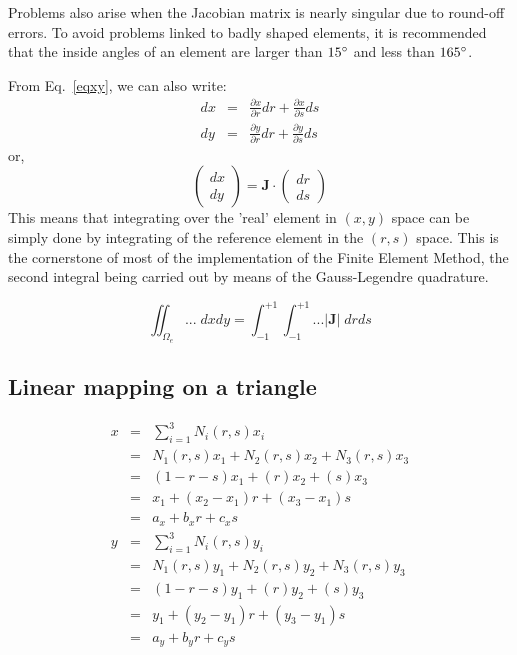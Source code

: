 \begin{remark}
Problems also arise when the Jacobian matrix is nearly singular due to round-off errors.
To avoid problems linked to badly shaped elements, it is recommended that the inside
angles of an element are larger than $15\degree$ and less than $165\degree$.
\end{remark}

From Eq.~\eqref{eqxy}, we can also write:
\begin{eqnarray}
dx &=& \frac{\partial x}{\partial r} dr + \frac{\partial x}{\partial s} ds \\
dy &=& \frac{\partial y}{\partial r} dr + \frac{\partial y}{\partial s} ds 
\end{eqnarray}
or, 
\begin{equation}
\left(
\begin{array}{c}
dx \\ dy
\end{array}
\right)
={\bm J}\cdot
\left(
\begin{array}{c}
dr \\ ds
\end{array}
\right)
\end{equation}
This means that integrating over the 'real' element in $(x,y)$ space
can be simply done by integrating of the reference element in the 
$(r,s)$ space. This is the cornerstone of most of the implementation of the 
Finite Element Method, the second integral being carried out by means 
of the Gauss-Legendre quadrature.

\begin{equation}
\iint_{\Omega_e} ... \; dx dy = \int_{-1}^{+1} \int_{-1}^{+1} ...|{\bm J}| \; dr ds
\end{equation}










\subsection{Linear mapping on a triangle}



\begin{eqnarray}
x 
&=& \sum_{i=1}^3 N_i(r,s) x_i \nonumber\\
&=& N_1(r,s) x_1 +N_2(r,s) x_2 +N_3(r,s) x_3   \nonumber\\
&=&  (1-r-s) x_1 +(r) x_2  +(s) x_3   \nonumber\\
&=& x_1 + (x_2-x_1) r + (x_3-x_1)s \nonumber\\
&=& a_x + b_x r + c_x s \nonumber\\
y 
&=& \sum_{i=1}^3 N_i(r,s) y_i \nonumber\\
&=& N_1(r,s) y_1 +N_2(r,s) y_2 +N_3(r,s) y_3   \nonumber\\
&=&  (1-r-s) y_1 +(r) y_2  +(s) y_3   \nonumber\\
&=& y_1 + (y_2-y_1) r + (y_3-y_1)s \nonumber\\
&=& a_y+ b_y r + c_y s 
\nonumber
\end{eqnarray}

